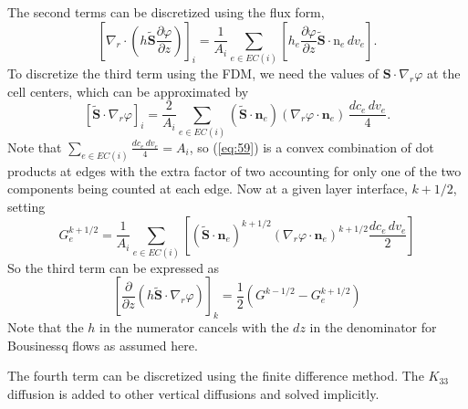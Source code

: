 \documentclass[12pt]{report}
\def\p{\partial}
\def\tilde{\widetilde}
\def\bs{\boldsymbol}
\def\nb{\bs{\mathrm{n}}}
\begin{document}
The second terms can be
discretized using the flux form,
\begin{equation}
  \label{eq:58}
  \left[ \nabla_r\cdot\left(h \tilde{\mathbf{S}}\dfrac{\p\varphi}{\p
      z}\right)\right]_i = 
\frac{1}{A_i} \sum_{e\in EC(i)}  \left[ h_e \dfrac{\p\varphi}{\p z}\tilde{\mathbf{S}}\cdot\nb_e \, dv_e \right] .
\end{equation}
 To discretize the
third term using the FDM, we need the values of
$\mathbf{S}\cdot\nabla_r\varphi$ at the cell centers, which can be
approximated by
\begin{equation}
\label{eq:59}
  \left[\tilde{\mathbf{S}}\cdot\nabla_r\varphi\right]_i = \frac{2}{A_i} \sum_{e\in
    EC(i)} \left( \tilde{\mathbf{S}}\cdot\mathbf{n}_e \right) \left( {\nabla_r\varphi}\cdot\mathbf{n}_e \right) \, \frac{dc_e \, dv_e}{4}.
\end{equation}
Note that $\sum_{e\in EC(i)} \frac{dc_e \, dv_e}{4}=A_i$, so (\ref{eq:59}) is a convex combination of dot products at edges with the extra factor of two accounting for only one of the two components being counted at each edge. Now at a given layer interface, $k+1/2$,  setting
\begin{equation}
G^{k+1/2}_e = \frac{1}{A_i} \sum_{e\in EC(i)} \left[ \left( \tilde{\mathbf{S}}\cdot\mathbf{n}_e \right)^{k+1/2} \left( {\nabla_r\varphi}\cdot\mathbf{n}_e \right)^{k+1/2} \frac{dc_e \, dv_e}{2} \right]
\end{equation}
So the third term can be expressed as
\begin{equation}
\left[ \dfrac{\p}{\p z}\left(h \tilde{\mathbf{S}}\cdot\nabla_r\varphi\right) \right]_k = \frac{1}{2} \left( G^{k-1/2} - G^{k+1/2}_e \right)  
\end{equation}
Note that the $h$ in the numerator cancels with the $dz$ in the denominator for Bousinessq flows as assumed here.

The fourth term can be discretized using the finite difference method. The $K_{33}$ diffusion is added to other vertical diffusions and solved implicitly.

\end{document}
